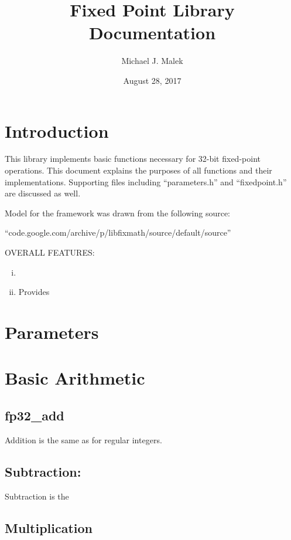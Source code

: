 \documentclass{article}
\title{Fixed Point Library Documentation}
\author{Michael J. Malek}
\date{August 28, 2017}
\begin{document}
\maketitle


\tableofcontents

\section{Introduction}

This library implements basic functions necessary for 32-bit fixed-point operations. 
This document explains the purposes  of all functions and their implementations. Supporting
files including ``parameters.h'' and ``fixedpoint.h'' are discussed as well. 

Model for the framework was drawn from the following source:

``code.google.com/archive/p/libfixmath/source/default/source''

OVERALL FEATURES:

\begin{enumerate}[i.]

\item 

\item Provides 

\end{enumerate}

\section{Parameters}




\section{Basic Arithmetic}

\subsection{fp32\_add}

Addition is the same as for regular integers.

\subsection{Subtraction: }

Subtraction is the 

\subsection{Multiplication}
\end{document}

